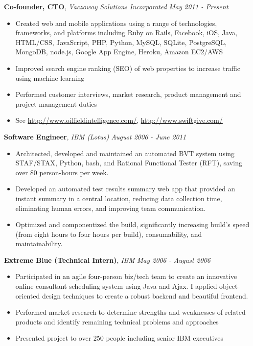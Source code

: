\documentclass[9pt]{article}
\newenvironment{changemargin}[2]{%
  \begin{list}{}{%
    \setlength{\topsep}{0pt}%
    \setlength{\leftmargin}{#1}%
    \setlength{\rightmargin}{#2}%
    \setlength{\listparindent}{\parindent}%
    \setlength{\itemindent}{\parindent}%
    \setlength{\parsep}{\parskip}%
  }%
  \item[]}{\end{list}
}
\newcommand{\jobdescription}[1]{
	\begin{changemargin}{0.15in}{0.15in}
    \smallskip
		{#1}
    \medskip
	\end{changemargin}
}
\newcommand{\jobtitle}[3]{
	\textbf{#1}, \emph{#2} \hfill \emph{#3}\\
}
\newenvironment{body} {
	\vspace*{-16pt}
	\begin{changemargin}{-0.25in}{-0.5in}
  }	
	{\end{changemargin}
}
\begin{document}
\begin{body}
  \jobtitle{Co-founder, CTO}{Vaczoway Solutions Incorporated}{May 2011 - Present}
  \jobdescription{
  	\begin{itemize} \itemsep -0pt  %
  		\item Created web and mobile applications using a range of technologies, frameworks, and platforms including Ruby on Rails, Facebook, iOS, Java, HTML/CSS, JavaScript, PHP, Python, MySQL, SQLite, PostgreSQL, MongoDB, node.js, Google App Engine, Heroku, Amazon EC2/AWS
  		\item Improved search engine ranking (SEO) of web properties to increase traffic using machine learning
  		\item Performed customer interviews, market research, product management and project management duties
      \item See \url{http://www.oilfieldintelligence.com/}, \url{http://www.swiftgive.com/}
  	\end{itemize}
  }


	\jobtitle{Software Engineer}{IBM (Lotus)}{August 2006 - June 2011}
  \jobdescription{
  	\begin{itemize} \itemsep -0pt  %
  		\item Architected, developed and maintained an automated BVT system using STAF/STAX, Python, bash, and Rational Functional Tester (RFT), saving over 80 person-hours per week.
      \item Developed an automated test results summary web app that provided an instant summary in a central location, reducing data collection time, eliminating human errors, and improving team communication. 
      \item Optimized and componentized the build, significantly increasing build’s speed (from eight hours to four hours per build), consumability, and maintainability.
  	\end{itemize}
  }


	\jobtitle{Extreme Blue (Technical Intern)}{IBM}{May 2006 - August 2006}
  \jobdescription {
  	\begin{itemize} \itemsep -0pt  %
      \item Participated in an agile four-person biz/tech team to create an innovative online consultant scheduling system using Java and Ajax. I applied object-oriented design techniques to create a robust backend and beautiful frontend. 
      \item Performed market research to determine strengths and weaknesses of related products and identify remaining technical problems and approaches\\
      \item Presented project to over 250 people including senior IBM executives\\
    \end{itemize}
  }



\end{body}
\end{document}
